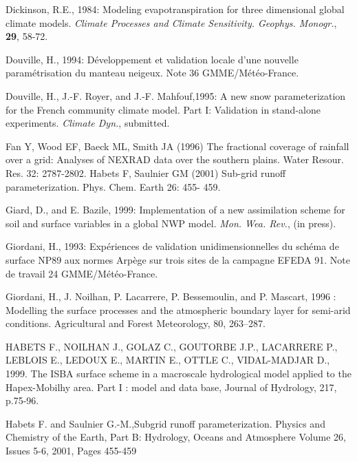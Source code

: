 \begin{description}
\item
Dickinson, R.E., 1984:
Modeling evapotranspiration for three dimensional global
climate models.
{\em Climate Processes and Climate Sensitivity.
Geophys. Monogr.},
{\bf 29},
58-72.

\item
Douville, H., 1994:
D\'eveloppement et validation locale d'une nouvelle
param\'etrisation du manteau neigeux.
Note 36 GMME/M\'et\'eo-France.

\item
Douville, H., J.-F. Royer, and J.-F. Mahfouf,1995:
A new snow parameterization for the French community climate
model.  Part I:  Validation in stand-alone experiments.
{\em Climate Dyn.},
submitted.

\item
Fan Y, Wood EF, Baeck ML, Smith JA (1996) The fractional coverage of rainfall over a grid: 
Analyses of NEXRAD data over the southern plains. Water Resour. Res. 32: 2787-2802.
Habets F, Saulnier GM (2001) Sub-grid runoff parameterization. Phys. Chem. Earth 26: 455-
459.

\item
Giard, D., and E. Bazile, 1999:
Implementation of a new assimilation scheme for
soil and surface variables in a global NWP model.
{\em Mon. Wea. Rev.},
(in press).

\item
Giordani, H., 1993:
Exp\'eriences de validation unidimensionnelles du sch\'ema
de surface NP89 aux normes Arp\`ege sur trois sites de la
campagne EFEDA 91.
Note de travail 24 GMME/M\'et\'eo-France.

\item
Giordani, H., J. Noilhan, P. Lacarrere, P. Bessemoulin, and P. Mascart, 1996 : Modelling the surface
processes and the atmospheric boundary layer for semi-arid conditions. Agricultural and Forest
Meteorology, 80, 263–287.

\item
HABETS F., NOILHAN J., GOLAZ C., GOUTORBE J.P., LACARRERE P., LEBLOIS E., LEDOUX E., MARTIN E., OTTLE C., VIDAL-MADJAR D., 1999. The ISBA surface scheme in a macroscale hydrological model applied to the Hapex-Mobilhy area. Part I : model and data base, Journal of Hydrology, 217, p.75-96.

\item
Habets F. and Saulnier G.-M.,Subgrid runoff parameterization.
Physics and Chemistry of the Earth, Part B: Hydrology, Oceans and Atmosphere
Volume 26, Issues 5-6, 2001, Pages 455-459 


\end{description}
